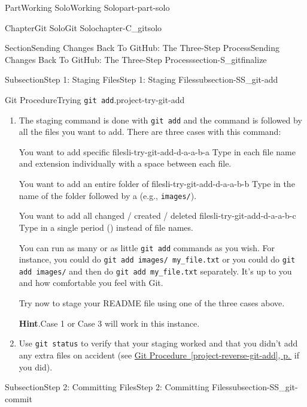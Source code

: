 \documentclass[twoside,10pt,]{book}
\newcommand{\blocktitlefont}{\relax}
\newcommand{\xreffont}{\relax}
\newcommand{\mono}[1]{\texttt{#1}}
\newcommand{\kbd}[1]{\keys{{#1}}}
\begin{document}
\begin{partptx}{Part}{Working Solo}{}{Working Solo}{}{}{part-part-solo}
\begin{chapterptx}{Chapter}{Git Solo}{}{Git Solo}{}{}{chapter-C_gitsolo}
\begin{sectionptx}{Section}{Sending Changes Back To GitHub: The Three-Step Process}{}{Sending Changes Back To GitHub: The Three-Step Process}{}{}{section-S_gitfinalize}
\begin{subsectionptx}{Subsection}{Step 1: Staging Files}{}{Step 1: Staging Files}{}{}{subsection-SS_git-add}
\begin{project}{Git Procedure}{Trying \mono{git add}.}{project-try-git-add}
\begin{enumerate}[font=\bfseries,label=(\alph*),ref=\alph*]
\item{}The staging command is done with \mono{git add} and the command is followed by all the files you want to add. There are three cases with this command:%
\begin{descriptionlist}
\begin{dlimedium}{You want to add specific files}{li-try-git-add-d-a-a-b-a}%
Type in each file name and extension individually with a space between each file.%
\end{dlimedium}%
\begin{dlimedium}{You want to add an entire folder of files}{li-try-git-add-d-a-a-b-b}%
Type in the name of the folder followed by a \kbd{/} (e.g.\@, \mono{images/}).%
\end{dlimedium}%
\begin{dlimedium}{You want to add all changed \slash{} created \slash{} deleted files}{li-try-git-add-d-a-a-b-c}%
Type in a single period (\kbd{.}) instead of file names.%
\end{dlimedium}%
\end{descriptionlist}
%
\par
You can run as many or as little \mono{git add} commands as you wish. For instance, you could do \mono{git add images/ my\_file.txt} or you could do \mono{git add images/} and then do \mono{git add my\_file.txt} separately. It's up to you and how comfortable you feel with Git.%
\par
Try now to stage your README file using one of the three cases above.%
\par\smallskip%
\noindent\textbf{\blocktitlefont Hint}.\label{hint-try-git-add-d-b}{}\hypertarget{hint-try-git-add-d-b}{}\quad{}Case 1 or Case 3 will work in this instance.%
\item{}Use \mono{git status} to verify that your staging worked and that you didn't add any extra files on accident (see \hyperref[project-reverse-git-add]{Git Procedure~{\xreffont\ref{project-reverse-git-add}}, p.\,\pageref{project-reverse-git-add}} if you did).%
\end{enumerate}%
\end{project}%
\end{subsectionptx}
%
%
\typeout{************************************************}
\typeout{************************************************}
%
\begin{subsectionptx}{Subsection}{Step 2: Committing Files}{}{Step 2: Committing Files}{}{}{subsection-SS_git-commit}
%

\end{subsectionptx}
\end{sectionptx}
\end{chapterptx}
\end{partptx}
\end{document}
